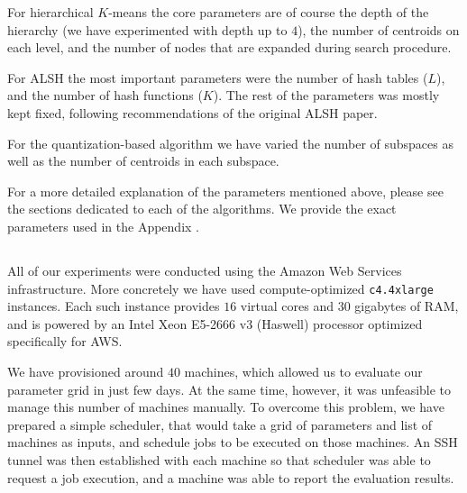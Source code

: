         For hierarchical $K$-means the core parameters are of course the depth of the hierarchy
        (we have experimented with depth up to $4$), the number of centroids on each level,
        and the number of nodes that are expanded during search procedure.

        For ALSH the most important parameters were the number of hash tables ($L$),
        and the number of hash functions ($K$). The rest of the parameters was mostly kept fixed, following 
        recommendations of the original ALSH paper.

        For the quantization-based algorithm we have varied the number of subspaces as well as the number of centroids
        in each subspace.

        For a more detailed explanation of the parameters mentioned above, please see the sections
        dedicated to each of the algorithms.
        We provide the exact parameters used in the Appendix .

    \subsection{}

        All of our experiments were conducted using the Amazon Web Services infrastructure.
        More concretely we have used compute-optimized \texttt{c4.4xlarge} instances. Each such
        instance provides $16$ virtual cores and $30$ gigabytes of RAM, and is powered
        by an Intel Xeon E5-2666 v3 (Haswell) processor optimized specifically for AWS.

        We have provisioned around $40$ machines, which allowed us to evaluate our parameter grid
        in just few days.
        At the same time, however, it was unfeasible to manage this number of machines manually.
        To overcome this problem, we have prepared a simple scheduler,
        that would take a grid of parameters and list of machines as inputs, and schedule
        jobs to be executed on those machines.
        An SSH tunnel was then established with each machine so that scheduler
        was able to request a job execution, and a machine was able to report the evaluation results.
